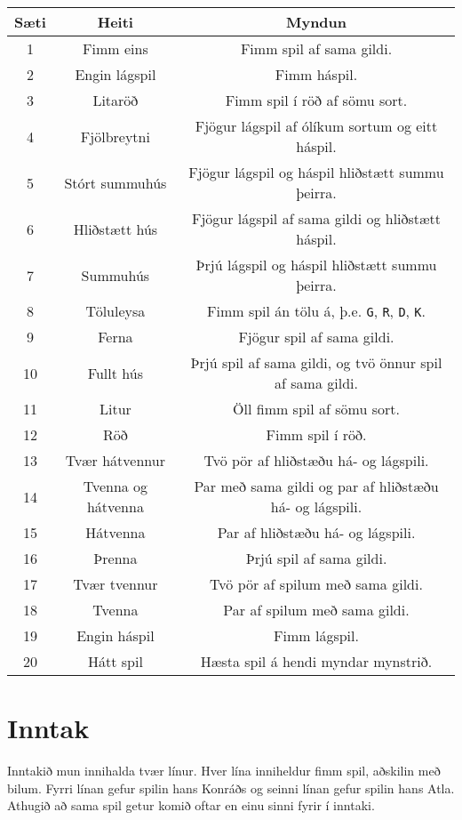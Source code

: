 \begin{tabular}{|c|c|c|} \hline
    Sæti & Heiti & Myndun \\ \hline
    1 & Fimm eins & Fimm spil af sama gildi. \\ \hline
    2 & Engin lágspil & Fimm háspil. \\ \hline
    3 & Litaröð & Fimm spil í röð af sömu sort. \\ \hline
    4 & Fjölbreytni & Fjögur lágspil af ólíkum sortum og eitt háspil. \\ \hline
    5 & Stórt summuhús & Fjögur lágspil og háspil hliðstætt summu þeirra. \\ \hline 
    6 & Hliðstætt hús & Fjögur lágspil af sama gildi og hliðstætt háspil. \\ \hline 
    7 & Summuhús & Þrjú lágspil og háspil hliðstætt summu þeirra. \\ \hline 
    8 & Töluleysa & Fimm spil án tölu á, þ.e. \texttt{G}, \texttt{R}, \texttt{D}, \texttt{K}. \\ \hline 
    9 & Ferna & Fjögur spil af sama gildi. \\ \hline
    10 & Fullt hús & Þrjú spil af sama gildi, og tvö önnur spil af sama gildi. \\ \hline 
    11 & Litur & Öll fimm spil af sömu sort. \\ \hline
    12 & Röð & Fimm spil í röð. \\ \hline
    13 & Tvær hátvennur & Tvö pör af hliðstæðu há- og lágspili. \\ \hline
    14 & Tvenna og hátvenna & Par með sama gildi og par af hliðstæðu há- og lágspili. \\ \hline
    15 & Hátvenna & Par af hliðstæðu há- og lágspili. \\ \hline
    16 & Þrenna & Þrjú spil af sama gildi. \\ \hline
    17 & Tvær tvennur & Tvö pör af spilum með sama gildi. \\ \hline
    18 & Tvenna & Par af spilum með sama gildi. \\ \hline
    19 & Engin háspil & Fimm lágspil. \\ \hline
    20 & Hátt spil & Hæsta spil á hendi myndar mynstrið. \\ \hline
\end{tabular}

\section*{Inntak}
Inntakið mun innihalda tvær línur. Hver lína inniheldur fimm spil, aðskilin með bilum. Fyrri línan gefur spilin hans Konráðs
og seinni línan gefur spilin hans Atla. Athugið að sama spil getur komið oftar en einu sinni fyrir í inntaki.

